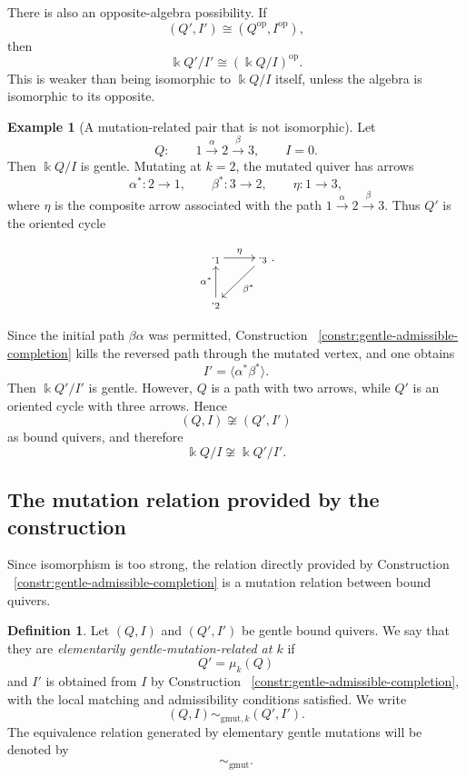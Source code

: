 \documentclass[11pt]{article}
\newcommand{\K}{\Bbbk}
\theoremstyle{plain}
\theoremstyle{definition}
\newtheorem{definition}[theorem]{Definition}
\newtheorem{example}[theorem]{Example}
\theoremstyle{remark}
\begin{document}
There is also an opposite-algebra possibility.  If
\[
  (Q',I')\cong (Q^{\operatorname{op}},I^{\operatorname{op}}),
\]
then
\[
  \K Q'/I'\cong (\K Q/I)^{\operatorname{op}}.
\]
This is weaker than being isomorphic to \(\K Q/I\) itself, unless the algebra
is isomorphic to its opposite.

\begin{example}[A mutation-related pair that is not isomorphic]
Let
\[
  Q:
  \qquad
  1\xrightarrow{\alpha}2\xrightarrow{\beta}3,
  \qquad
  I=0.
\]
Then \(\K Q/I\) is gentle.  Mutating at \(k=2\), the mutated quiver has arrows
\[
  \alpha^*:2\to 1,
  \qquad
  \beta^*:3\to 2,
  \qquad
  \eta:1\to 3,
\]
where \(\eta\) is the composite arrow associated with the path
\(1\xrightarrow{\alpha}2\xrightarrow{\beta}3\).  Thus \(Q'\) is the oriented
cycle

\begin{equation}\label{}
\nonumber   \xymatrix{
\cdot_{1} \ar[r]^{\eta} & \ar[dl]^{\beta^*}\cdot_{3}   \\
\cdot_{2}\ar[u]^{\alpha^*}}.
  \end{equation}

Since the initial path \(\beta\alpha\) was permitted, 
Construction ~\ref{constr:gentle-admissible-completion}
 kills the reversed path through the mutated
vertex, and one obtains
\[
  I'=\langle \alpha^*\beta^*\rangle.
\]
Then \(\K Q'/I'\) is gentle.  However, \(Q\) is a path with two arrows, while
\(Q'\) is an oriented cycle with three arrows.  Hence
\[
  (Q,I)\not\cong (Q',I')
\]
as bound quivers, and therefore
\[
  \K Q/I\not\cong \K Q'/I'.
\]
\end{example}

\subsection{The mutation relation provided by the construction}

Since isomorphism is too strong, the relation directly provided by Construction ~\ref{constr:gentle-admissible-completion}  is a mutation relation between bound quivers.

\begin{definition}
Let \((Q,I)\) and \((Q',I')\) be gentle bound quivers.  We say that they are
\emph{elementarily gentle-mutation-related at \(k\)} if
\[
  Q'=\mu_k(Q)
\]
and \(I'\) is obtained from \(I\) by Construction ~\ref{constr:gentle-admissible-completion},
with the local matching and admissibility conditions satisfied.  We write
\[
  (Q,I)\sim_{\mathrm{gmut},k}(Q',I').
\]
The equivalence relation generated by elementary gentle mutations will be
denoted by
\[
  \sim_{\mathrm{gmut}}.
\]
\end{definition}
\end{document}
